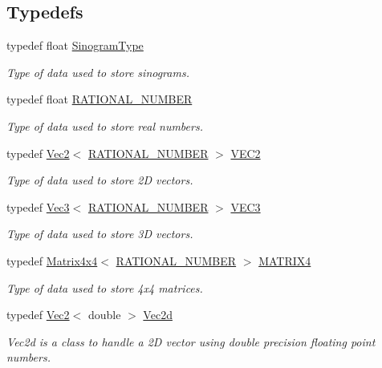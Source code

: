 \subsection*{Typedefs}
\begin{DoxyCompactItemize}
\item 
typedef float \hyperlink{namespace_utilities_aec83622a80513f15f2bdee483a6af7a0}{SinogramType}
\begin{DoxyCompactList}\small\item\em Type of data used to store sinograms. \end{DoxyCompactList}\item 
typedef float \hyperlink{namespace_utilities_a40969b96bd8d847b962e297cb79f08ce}{RATIONAL\_\-NUMBER}
\begin{DoxyCompactList}\small\item\em Type of data used to store real numbers. \end{DoxyCompactList}\item 
typedef \hyperlink{class_math_1_1_vec2}{Vec2}$<$ \hyperlink{namespace_utilities_a40969b96bd8d847b962e297cb79f08ce}{RATIONAL\_\-NUMBER} $>$ \hyperlink{namespace_utilities_a077a697d578c30ddec5ec97382be0a92}{VEC2}
\begin{DoxyCompactList}\small\item\em Type of data used to store 2D vectors. \end{DoxyCompactList}\item 
typedef \hyperlink{class_math_1_1_vec3}{Vec3}$<$ \hyperlink{namespace_utilities_a40969b96bd8d847b962e297cb79f08ce}{RATIONAL\_\-NUMBER} $>$ \hyperlink{namespace_utilities_af627ed108a4935196373499e157d3937}{VEC3}
\begin{DoxyCompactList}\small\item\em Type of data used to store 3D vectors. \end{DoxyCompactList}\item 
typedef \hyperlink{class_math_1_1_matrix4x4}{Matrix4x4}$<$ \hyperlink{namespace_utilities_a40969b96bd8d847b962e297cb79f08ce}{RATIONAL\_\-NUMBER} $>$ \hyperlink{namespace_utilities_a1e64fcb5d60661c7b2a3a5e7c96cc09f}{MATRIX4}
\begin{DoxyCompactList}\small\item\em Type of data used to store 4x4 matrices. \end{DoxyCompactList}\item 
typedef \hyperlink{class_math_1_1_vec2}{Vec2}$<$ double $>$ \hyperlink{namespace_utilities_aaa021d29b05a070e411503f3a16dfcf7}{Vec2d}
\begin{DoxyCompactList}\small\item\em Vec2d is a class to handle a 2D vector using double precision floating point numbers. \end{DoxyCompactList}\item 

\end{DoxyCompactItemize}
